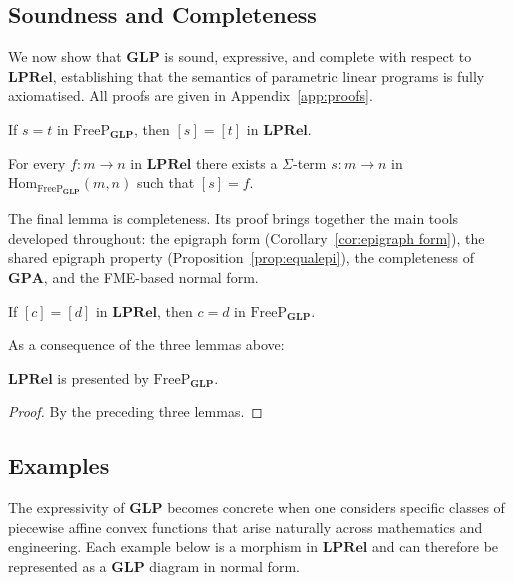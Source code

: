 \subsection{Soundness and Completeness}\label{sec:complete}

We now show that $\mathbf{GLP}$ is sound, expressive, and complete with
respect to $\mathbf{LPRel}$, establishing that the semantics of parametric
linear programs is fully axiomatised. All proofs are given in
Appendix~\ref{app:proofs}.

\begin{lemma}[Soundness]\label{lem:soundness}
	If $s = t$ in $\mathrm{FreeP}_{\mathbf{GLP}}$, then $[s] = [t]$
	in $\mathbf{LPRel}$.
\end{lemma}

\begin{lemma}[Expressivity]\label{lem:expressivity}
	For every $f : m \to n$ in $\mathbf{LPRel}$ there exists a
	$\Sigma$-term $s : m \to n$ in
	$\mathrm{Hom}_{\mathrm{FreeP}_{\mathbf{GLP}}}(m,n)$
	such that $[s] = f$.
\end{lemma}

The final lemma is completeness. Its proof brings together the main
tools developed throughout: the epigraph form
(Corollary~\ref{cor:epigraph form}), the shared epigraph property
(Proposition~\ref{prop:equalepi}), the completeness of $\mathbf{GPA}$,
and the FME-based normal form.

\begin{lemma}[Completeness]\label{lem:completeness}
	If $[c] = [d]$ in $\mathbf{LPRel}$, then $c = d$ in
	$\mathrm{FreeP}_{\mathbf{GLP}}$.
\end{lemma}

As a consequence of the three lemmas above:

\begin{theorem}\label{thm:main}
	$\mathbf{LPRel}$ is presented by $\mathrm{FreeP}_{\mathbf{GLP}}$.
\end{theorem}
\begin{proof}
	By the preceding three lemmas.
\end{proof}

\subsection{Examples}\label{sec:examples}

The expressivity of $\mathbf{GLP}$ becomes concrete when one considers specific classes of piecewise affine convex functions that arise naturally across mathematics and engineering. Each example below is a morphism in $\mathbf{LPRel}$ and can therefore be represented as a $\mathbf{GLP}$ diagram in normal form.


